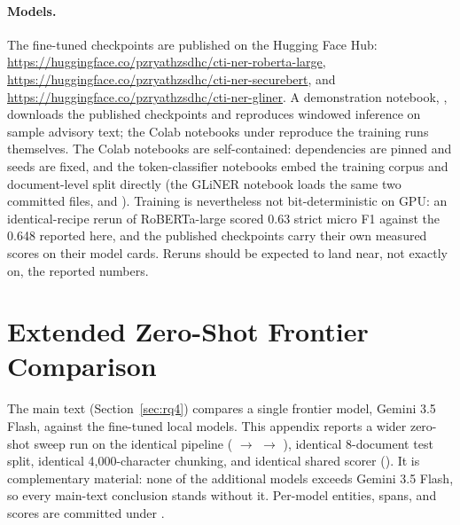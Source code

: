 \documentclass[11pt]{article}
\begin{document}
\paragraph{Models.} The fine-tuned checkpoints are published on the Hugging
Face Hub:
\url{https://huggingface.co/pzryathzsdhc/cti-ner-roberta-large},
\url{https://huggingface.co/pzryathzsdhc/cti-ner-securebert}, and
\url{https://huggingface.co/pzryathzsdhc/cti-ner-gliner}. A demonstration
notebook, , downloads the
published checkpoints and reproduces windowed inference on sample advisory
text; the Colab notebooks under  reproduce the training
runs themselves. The Colab notebooks are self-contained: dependencies
are pinned and seeds are fixed, and the token-classifier notebooks
embed the training corpus and document-level split directly (the GLiNER
notebook loads the same two committed files,
 and ). Training is nevertheless
not bit-deterministic on GPU: an identical-recipe rerun of
RoBERTa-large scored 0.63 strict micro F1 against the 0.648 reported
here, and the published checkpoints carry their own measured scores on
their model cards. Reruns should be expected to land near, not exactly
on, the reported numbers.
\endgroup




\appendix

\section{Extended Zero-Shot Frontier Comparison}
\label{app:frontier-extended}

The main text (Section~\ref{sec:rq4}) compares a single frontier model,
Gemini 3.5 Flash, against the fine-tuned local models. This appendix
reports a wider zero-shot sweep run on the identical pipeline
( $\to$  $\to$
), identical 8-document test split, identical
4{,}000-character chunking, and identical shared scorer
(). It is complementary material: none of the
additional models exceeds Gemini 3.5 Flash, so every main-text conclusion
stands without it. Per-model entities, spans, and scores are committed
under .
\end{document}
